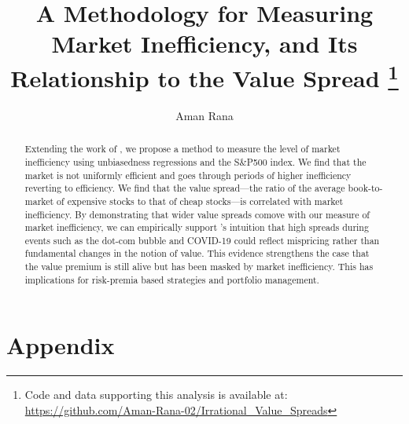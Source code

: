 \documentclass[11pt,a4paper,english]{article}
\date{\displaydate{date}}
\title{A Methodology for Measuring Market Inefficiency, and Its Relationship to the Value Spread 
\thanks{Code and data supporting this analysis is available at: \url{https://github.com/Aman-Rana-02/Irrational_Value_Spreads}}}
\author{%
  Aman Rana\\
}
\begin{document}
  \maketitle

  \begin{abstract}
    \noindent Extending the work of \citet{boguth_2023}, we propose a method to measure the level of market inefficiency using unbiasedness regressions and the S\&P500 index.
    We find that the market is not uniformly efficient and goes through periods of higher inefficiency reverting to efficiency. We find that the value spread—the ratio of the average book-to-market of expensive stocks to that of cheap stocks—is correlated with market inefficiency. 
    By demonstrating that wider value spreads comove with our measure of market inefficiency, we can empirically support \citet{asness_2024}'s intuition 
    that high spreads during events such as the dot-com bubble and COVID-19 could reflect mispricing rather than fundamental changes in the notion of value. 
    This evidence strengthens the case that the value premium is still alive but has been masked by market inefficiency. 
    This has implications for risk-premia based strategies and portfolio management.
  \end{abstract}

  \newpage
  \tableofcontents

  \newpage
  

  

  
  
  

  

  \newpage
  
  

  \newpage
  \section*{Appendix}
  \renewcommand{\thesection}{\Alph{section}}
  \setcounter{section}{0}
  
\end{document}
